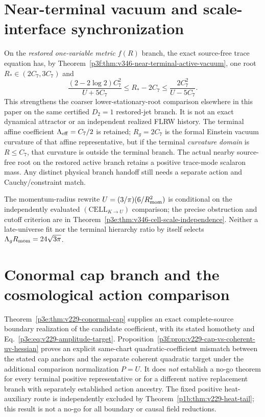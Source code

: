 \documentclass[12pt,a4paper]{article}
\begin{document}
\section{Near-terminal vacuum and scale-interface synchronization}
\label{p8:sec:v346-terminal-vacuum-sync}
On the \emph{restored one-variable metric $f(R)$} branch, the exact
source-free trace equation has, by
Theorem~\ref{p3f:thm:v346-near-terminal-active-vacuum}, one root
$R_*\in(2C_7,3C_7)$ and
\[
 \boxed{\frac{(2-2\log2)C_7^2}{U+5C_7}
 \le R_*-2C_7\le\frac{2C_7^2}{U-5C_7}.}
\]
This strengthens the coarser lower-stationary-root comparison elsewhere
in this paper on the same certified $D_2=1$ restored-jet branch.
It is not an exact dynamical attractor or an independent realized FLRW
history.  The terminal affine coefficient $\Lambda_{\rm eff}=C_7/2$
is retained; $R_g=2C_7$ is the formal Einstein vacuum curvature of
that affine representative, but if the terminal \emph{curvature domain}
is $R\le C_7$, that curvature is outside the terminal branch.  The
actual nearby source-free root on the restored active branch retains a
positive trace-mode scalaron mass.  Any distinct physical branch
handoff still needs a separate action and Cauchy/constraint match.

The momentum-radius rewrite $U=(3/\pi)(6/R_{\rm mom}^2)$ is
conditional on the independently evaluated
$(\mathrm{CELL}_{K\to U})$ comparison; the precise obstruction and
cutoff criterion are in
Theorem~\ref{p3e:thm:v346-cell-scale-independence}.
Neither a late-universe fit nor the terminal hierarchy ratio by itself
selects $\Lambda_gR_{\rm mom}=24\sqrt{3\pi}$.

\printbibliography
\section{Conormal cap branch and the cosmological action comparison}
\label{p6a:sec:v229-cap-branch}
Theorem~\ref{p3e:thm:v229-conormal-cap} supplies an exact complete-source
boundary realization of the candidate coefficient, with its stated
homothety and Eq.~\eqref{p3e:eq:v229-amplitude-target}.
Proposition~\ref{p3f:prop:v229-cap-vs-coherent-uv-hessian}
proves an explicit same-chart quadratic-coefficient mismatch between the
stated cap anchors and the separate coherent quadratic target under the
additional comparison normalization \(P=U\). It does \emph{not} establish a
no-go theorem for every terminal positive representative or for a different
native replacement branch with separately established action ancestry.
The fixed positive heat-auxiliary route is independently excluded by
Theorem~\ref{p1b:thm:v229-heat-tail}; this result is not a no-go for all
boundary or causal field reductions.
\end{document}

